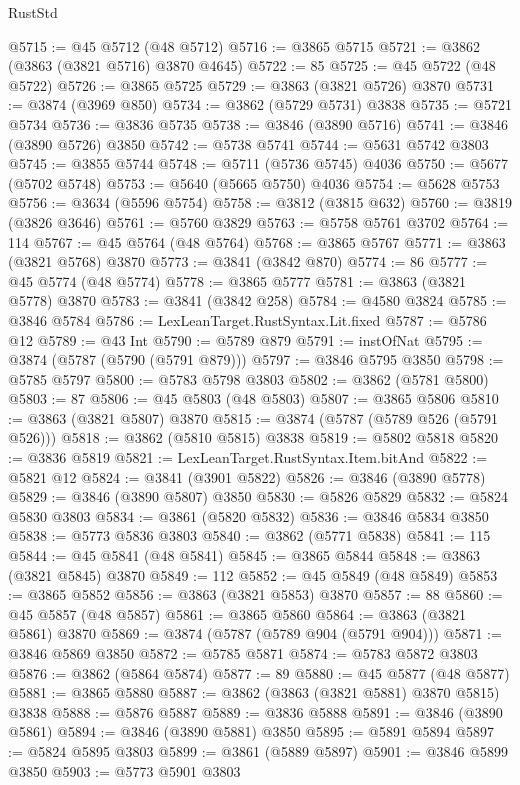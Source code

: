\begin{lexlean}{RustStd}
\begin{coremodule}
@5715 := @45 @5712 (@48 @5712)
@5716 := @3865 @5715
@5721 := @3862 (@3863 (@3821 @5716) @3870 @4645)
@5722 := 85
@5725 := @45 @5722 (@48 @5722)
@5726 := @3865 @5725
@5729 := @3863 (@3821 @5726) @3870
@5731 := @3874 (@3969 @850)
@5734 := @3862 (@5729 @5731) @3838
@5735 := @5721 @5734
@5736 := @3836 @5735
@5738 := @3846 (@3890 @5716)
@5741 := @3846 (@3890 @5726) @3850
@5742 := @5738 @5741
@5744 := @5631 @5742 @3803
@5745 := @3855 @5744
@5748 := @5711 (@5736 @5745) @4036
@5750 := @5677 (@5702 @5748)
@5753 := @5640 (@5665 @5750) @4036
@5754 := @5628 @5753
@5756 := @3634 (@5596 @5754)
@5758 := @3812 (@3815 @632)
@5760 := @3819 (@3826 @3646)
@5761 := @5760 @3829
@5763 := @5758 @5761 @3702
@5764 := 114
@5767 := @45 @5764 (@48 @5764)
@5768 := @3865 @5767
@5771 := @3863 (@3821 @5768) @3870
@5773 := @3841 (@3842 @870)
@5774 := 86
@5777 := @45 @5774 (@48 @5774)
@5778 := @3865 @5777
@5781 := @3863 (@3821 @5778) @3870
@5783 := @3841 (@3842 @258)
@5784 := @4580 @3824
@5785 := @3846 @5784
@5786 := LexLeanTarget.RustSyntax.Lit.fixed
@5787 := @5786 @12
@5789 := @43 Int
@5790 := @5789 @879
@5791 := instOfNat
@5795 := @3874 (@5787 (@5790 (@5791 @879)))
@5797 := @3846 @5795 @3850
@5798 := @5785 @5797
@5800 := @5783 @5798 @3803
@5802 := @3862 (@5781 @5800)
@5803 := 87
@5806 := @45 @5803 (@48 @5803)
@5807 := @3865 @5806
@5810 := @3863 (@3821 @5807) @3870
@5815 := @3874 (@5787 (@5789 @526 (@5791 @526)))
@5818 := @3862 (@5810 @5815) @3838
@5819 := @5802 @5818
@5820 := @3836 @5819
@5821 := LexLeanTarget.RustSyntax.Item.bitAnd
@5822 := @5821 @12
@5824 := @3841 (@3901 @5822)
@5826 := @3846 (@3890 @5778)
@5829 := @3846 (@3890 @5807) @3850
@5830 := @5826 @5829
@5832 := @5824 @5830 @3803
@5834 := @3861 (@5820 @5832)
@5836 := @3846 @5834 @3850
@5838 := @5773 @5836 @3803
@5840 := @3862 (@5771 @5838)
@5841 := 115
@5844 := @45 @5841 (@48 @5841)
@5845 := @3865 @5844
@5848 := @3863 (@3821 @5845) @3870
@5849 := 112
@5852 := @45 @5849 (@48 @5849)
@5853 := @3865 @5852
@5856 := @3863 (@3821 @5853) @3870
@5857 := 88
@5860 := @45 @5857 (@48 @5857)
@5861 := @3865 @5860
@5864 := @3863 (@3821 @5861) @3870
@5869 := @3874 (@5787 (@5789 @904 (@5791 @904)))
@5871 := @3846 @5869 @3850
@5872 := @5785 @5871
@5874 := @5783 @5872 @3803
@5876 := @3862 (@5864 @5874)
@5877 := 89
@5880 := @45 @5877 (@48 @5877)
@5881 := @3865 @5880
@5887 := @3862 (@3863 (@3821 @5881) @3870 @5815) @3838
@5888 := @5876 @5887
@5889 := @3836 @5888
@5891 := @3846 (@3890 @5861)
@5894 := @3846 (@3890 @5881) @3850
@5895 := @5891 @5894
@5897 := @5824 @5895 @3803
@5899 := @3861 (@5889 @5897)
@5901 := @3846 @5899 @3850
@5903 := @5773 @5901 @3803

\end{coremodule}
\end{lexlean}
